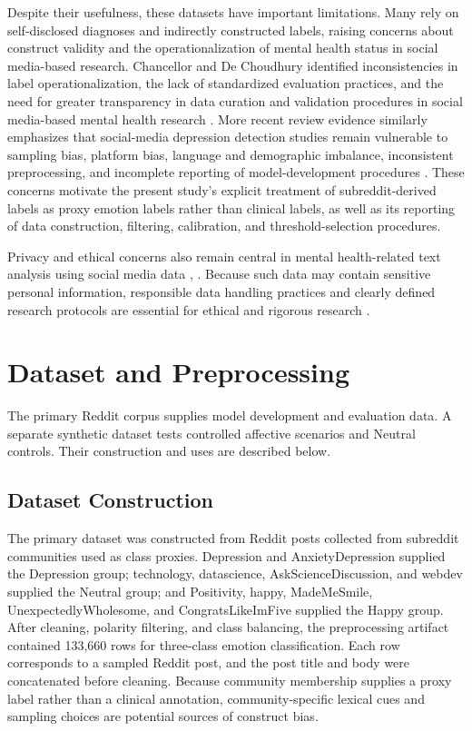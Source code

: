 \documentclass{ieeeaccess}
\begin{document}
Despite their usefulness, these datasets have important limitations. Many rely on self-disclosed diagnoses and indirectly constructed labels, raising concerns about construct validity and the operationalization of mental health status in social media-based research. Chancellor and De Choudhury identified inconsistencies in label operationalization, the lack of standardized evaluation practices, and the need for greater transparency in data curation and validation procedures in social media-based mental health research \cite{ref37}. More recent review evidence similarly emphasizes that social-media depression detection studies remain vulnerable to sampling bias, platform bias, language and demographic imbalance, inconsistent preprocessing, and incomplete reporting of model-development procedures \cite{ref46}. These concerns motivate the present study's explicit treatment of subreddit-derived labels as proxy emotion labels rather than clinical labels, as well as its reporting of data construction, filtering, calibration, and threshold-selection procedures.

Privacy and ethical concerns also remain central in mental health-related text analysis using social media data \cite{ref38}, \cite{ref39}. Because such data may contain sensitive personal information, responsible data handling practices and clearly defined research protocols are essential for ethical and rigorous research \cite{ref39}.

\section{Dataset and Preprocessing}

The primary Reddit corpus supplies model development and evaluation data. A separate synthetic dataset tests controlled affective scenarios and Neutral controls. Their construction and uses are described below.

\subsection{Dataset Construction}

The primary dataset was constructed from Reddit posts collected from subreddit communities used as class proxies. Depression and AnxietyDepression supplied the Depression group; technology, datascience, AskScienceDiscussion, and webdev supplied the Neutral group; and Positivity, happy, MadeMeSmile, UnexpectedlyWholesome, and CongratsLikeImFive supplied the Happy group. After cleaning, polarity filtering, and class balancing, the preprocessing artifact contained 133,660 rows for three-class emotion classification. Each row corresponds to a sampled Reddit post, and the post title and body were concatenated before cleaning. Because community membership supplies a proxy label rather than a clinical annotation, community-specific lexical cues and sampling choices are potential sources of construct bias.
\end{document}
